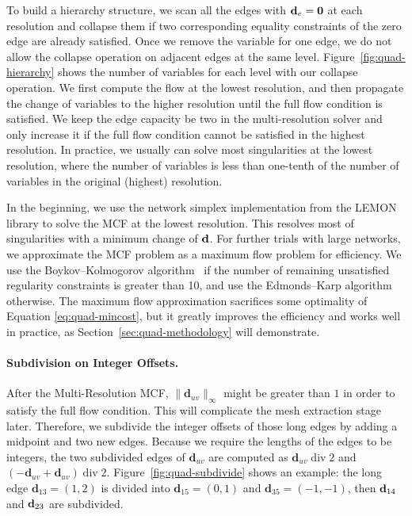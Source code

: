 To build a hierarchy structure, we scan all the edges with ${\mathbf{d}}_e=\textbf{0}$ at each resolution and collapse them if two corresponding equality constraints of the zero edge are already satisfied. Once we remove the variable for one edge, we do not allow the collapse operation on adjacent edges at the same level. Figure~\ref{fig:quad-hierarchy} shows the number of variables for each level with our collapse operation. We first compute the flow at the lowest resolution, and then propagate the change of variables to the higher resolution until the full flow condition is satisfied.  We keep the edge capacity be two in the multi-resolution solver and only increase it if the full flow condition cannot be satisfied in the highest resolution. In practice, we usually can solve most singularities at the lowest resolution, where the number of variables is less than one-tenth of the number of variables in the original (highest) resolution.  

In the beginning, we use the network simplex implementation from the LEMON library \cite{dezsHo2011lemon} to solve the MCF at the lowest resolution.  This resolves most of singularities with a minimum change of ${\mathbf{d}}$.  For further trials with large networks, we approximate the MCF problem as a maximum flow problem for efficiency.  We use the Boykov--Kolmogorov algorithm~\cite{boykov2004experimental} if the number of remaining unsatisfied regularity constraints is greater than 10, and use the Edmonds--Karp algorithm~\cite{edmonds1972theoretical} otherwise.  The maximum flow approximation sacrifices some optimality of Equation \eqref{eq:quad-mincost}, but it greatly improves the efficiency and works well in practice, as Section~\ref{sec:quad-methodology} will demonstrate.

\paragraph*{Subdivision on Integer Offsets.}
After the Multi-Resolution MCF, $\|{\textbf{d}}_{uv}\|_{\infty}$ might be greater than $1$ in order to satisfy the full flow condition.  This will complicate the mesh extraction stage later. Therefore, we subdivide the integer offsets of those long edges by adding a midpoint and two new edges. Because we require the lengths of the edges to be integers, the two subdivided edges of ${\textbf{d}}_{uv}$ are computed as ${\textbf{d}}_{uv}\;\text{div}\;2$ and $(-{\textbf{d}}_{uv}+{\textbf{d}}_{uv})\;\text{div}\;2$. Figure~\ref{fig:quad-subdivide} shows an example: the long edge ${\textbf{d}}_{13}=(1,2)$ is divided into ${\textbf{d}}_{15}=(0,1)$ and ${\textbf{d}}_{35}=(-1,-1)$, then ${\mathbf{d}}_{14}$ and ${\mathbf{d}}_{23}$ are subdivided.

